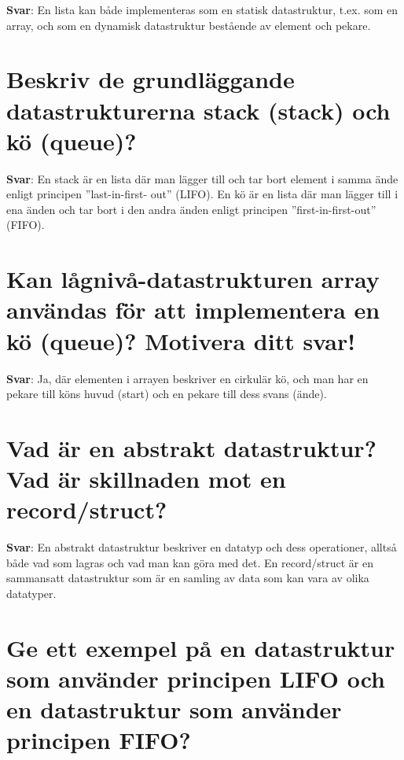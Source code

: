 \documentclass[a4paper,11pt,oneside]{book}
\begin{document}
\begin{sloppypar}
\textbf{Svar}: En lista kan b\r{a}de implementeras som en statisk datastruktur, t.ex. som en array, och som en dynamisk datastruktur best\r{a}ende av element och pekare.



\section{Beskriv de grundl\"aggande datastrukturerna stack (stack) och k\"o (queue)?}

\label{q:258:sa:sv:True}

\textbf{Svar}: En stack \"ar en lista d\"ar man l\"agger till och tar bort element i samma \"ande enligt principen {\textquotedblright}last-in-first- out{\textquotedblright} (LIFO). En k\"o \"ar en lista d\"ar man l\"agger till i ena \"anden och tar bort i den andra \"anden enligt principen {\textquotedblright}first-in-first-out{\textquotedblright} (FIFO).



\section{Kan l\r{a}gniv\r{a}-datastrukturen array anv\"andas f\"or att implementera en k\"o (queue)? Motivera ditt svar!}

\label{q:259:sa:sv:True}

\textbf{Svar}: Ja, d\"ar elementen i arrayen beskriver en cirkul\"ar k\"o, och man har en pekare till k\"ons huvud (start) och en pekare till dess svans (\"ande).



\section{Vad \"ar en abstrakt datastruktur? Vad \"ar skillnaden mot en record/struct?}

\label{q:260:sa:sv:True}

\textbf{Svar}: En abstrakt datastruktur beskriver en datatyp och dess operationer, allts\r{a} b\r{a}de vad som lagras och vad man kan g\"ora med det. En record/struct \"ar en sammansatt datastruktur som \"ar en samling av data som kan vara av olika datatyper.



\section{Ge ett exempel p\r{a} en datastruktur som anv\"ander principen LIFO och en datastruktur som anv\"ander principen FIFO?}


\end{sloppypar}
\end{document}
